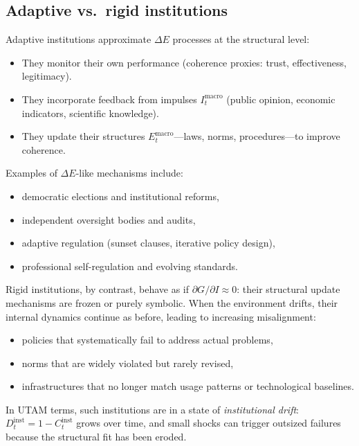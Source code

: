\documentclass[12pt,a4paper]{report}
\begin{document}
\subsection*{Adaptive vs.\ rigid institutions}

Adaptive institutions approximate \(\Delta E\) processes at the structural level:

\begin{itemize}[leftmargin=2em]
    \item They monitor their own performance (coherence proxies: trust, effectiveness, legitimacy).
    \item They incorporate feedback from impulses \(I_t^{\mathrm{macro}}\) (public opinion, economic indicators, scientific knowledge).
    \item They update their structures \(E_t^{\mathrm{macro}}\)---laws, norms, procedures---to improve coherence.
\end{itemize}

Examples of $\Delta E$-like mechanisms include:

\begin{itemize}[leftmargin=2em]
    \item democratic elections and institutional reforms,
    \item independent oversight bodies and audits,
    \item adaptive regulation (sunset clauses, iterative policy design),
    \item professional self-regulation and evolving standards.
\end{itemize}

Rigid institutions, by contrast, behave as if \(\partial G / \partial I \approx 0\): their structural update mechanisms are frozen or purely symbolic. When the environment drifts, their internal dynamics continue as before, leading to increasing misalignment:

\begin{itemize}[leftmargin=2em]
    \item policies that systematically fail to address actual problems,
    \item norms that are widely violated but rarely revised,
    \item infrastructures that no longer match usage patterns or technological baselines.
\end{itemize}

In UTAM terms, such institutions are in a state of \emph{institutional drift}: \(D_t^{\mathrm{inst}} = 1 - C_t^{\mathrm{inst}}\) grows over time, and small shocks can trigger outsized failures because the structural fit has been eroded.
\end{document}
